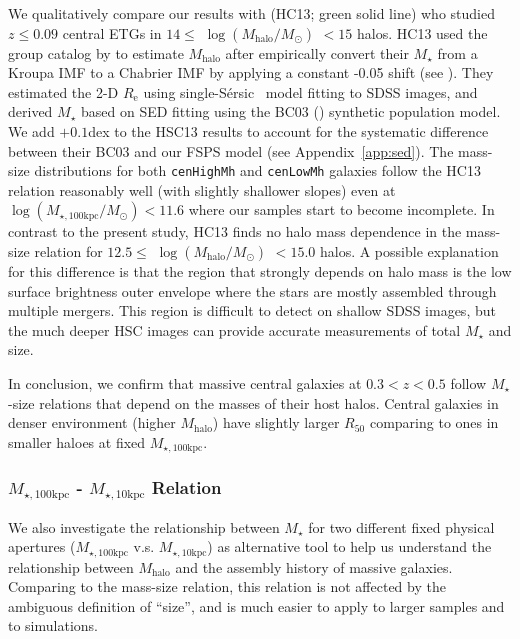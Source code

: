 \documentclass[a4paper,fleqn,usenatbib]{mnras}
\def\ser{{S\'{e}rsic\ }}
\def\rbcg{\texttt{cenHighMh}}
\def\nbcg{\texttt{cenLowMh}}
\def\mstar{{$M_{\star}$}}
\def\mhalo{{$M_{\mathrm{halo}}$}}
\def\logmh{{$\log (M_{\mathrm{halo}}/M_{\odot})$}}
\def\minn{{$M_{\star,10\mathrm{kpc}}$}}
\def\mtot{{$M_{\star,100\mathrm{kpc}}$}}
\def\logmtot{{$\log (M_{\star,100\mathrm{kpc}}/M_{\odot})$}}
\begin{document}
    We qualitatively compare our results with \citealt{HCompany13} (HC13; green solid line) 
    who studied $z\leq 0.09$ central ETGs in  $14\le$ \logmh{} $<15$ halos. 
    HC13 used the group catalog by \citet{Yang2007} to estimate \mhalo{} after empirically 
    convert their \mstar{} from a Kroupa IMF to a Chabrier IMF by applying a constant 
    -0.05 shift (see \citealt{Bernardi2016}).
    They estimated the 2-D $R_{\mathrm{e}}$ using single-\ser{} model fitting to SDSS 
    images, and derived \mstar{} based on SED fitting using the BC03 (\citealt{BC03}) 
    synthetic population model. 
    We add $+0.1$dex to the HSC13 results to account for the systematic 
    difference between their BC03 and our FSPS model (see Appendix~\ref{app:sed}). 
    The mass-size distributions for both \rbcg{} and \nbcg{} galaxies follow the 
    HC13 relation reasonably well (with slightly shallower slopes) even at 
    \logmtot{}$< 11.6$ where our samples start to become incomplete. 
    In contrast to the present study, HC13 finds no halo mass dependence in the 
    mass-size relation for $12.5\le$ \logmh{} $<15.0$ halos.
    A possible explanation for this difference is that the region that strongly depends 
    on halo mass is the low surface brightness outer envelope where the stars are 
    mostly assembled through multiple mergers. 
    This region is difficult to detect on shallow SDSS images, but the much deeper 
    HSC images can provide accurate measurements of total \mstar{} and size. 
     
    In conclusion, we confirm that massive central galaxies at $0.3 < z < 0.5$
    follow \mstar{}-size relations that depend on the masses of their host halos. 
    Central galaxies in denser environment (higher \mhalo{}) have slightly 
    larger $R_{\mathrm{50}}$ comparing to ones in smaller haloes at fixed 
    \mtot{}. 
    
\subsubsection{\mtot{} - \minn{} Relation}
    \label{sssec:m100_m10}
    
    We also investigate the relationship between \mstar{} for two different
    fixed physical apertures (\mtot{} v.s. \minn{}) as alternative tool to help us 
    understand the relationship between \mhalo{} and the assembly history of massive
    galaxies.   
    Comparing to the mass-size relation, this relation is not affected by the 
    ambiguous definition of ``size'', and is much easier to apply to larger samples 
    and to simulations. 
    
\end{document}

